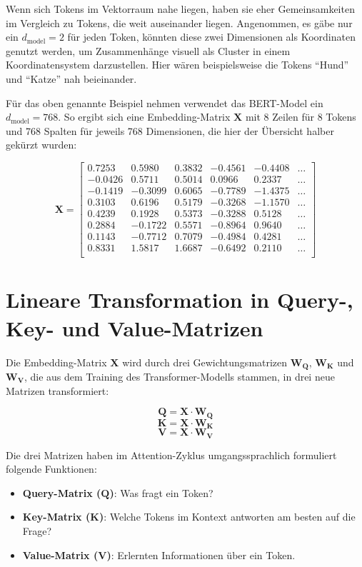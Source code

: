 Wenn sich Tokens im Vektorraum nahe liegen, haben sie eher Gemeinsamkeiten im Vergleich zu Tokens, die weit auseinander liegen.  
Angenommen, es gäbe nur ein \( d_{\text{model}} = 2 \) für jeden Token, könnten diese zwei Dimensionen als Koordinaten genutzt werden, um Zusammenhänge visuell als Cluster in einem Koordinatensystem darzustellen.  
Hier wären beispielsweise die Tokens \enquote{Hund} und \enquote{Katze} nah beieinander.

Für das oben genannte Beispiel nehmen verwendet das BERT-Model ein \( d_{\text{model}} = 768 \).  
So ergibt sich eine Embedding-Matrix $\mathbf{X}$ mit 8 Zeilen für 8 Tokens und 768 Spalten für jeweils 768 Dimensionen, die hier der Übersicht halber gekürzt wurden:

\[
\mathbf{X} =
\begin{bmatrix}
0.7253 & 0.5980 & 0.3832 & -0.4561 & -0.4408 & \dots \\
-0.0426 & 0.5711 & 0.5014 & 0.0966 & 0.2337 & \dots \\
-0.1419 & -0.3099 & 0.6065 & -0.7789 & -1.4375 & \dots \\
0.3103 & 0.6196 & 0.5179 & -0.3268 & -1.1570 & \dots \\
0.4239 & 0.1928 & 0.5373 & -0.3288 & 0.5128 & \dots \\
0.2884 & -0.1722 & 0.5571 & -0.8964 & 0.9640 & \dots \\
0.1143 & -0.7712 & 0.7079 & -0.4984 & 0.4281 & \dots \\
0.8331 & 1.5817 & 1.6687 & -0.6492 & 0.2110 & \dots \\
\end{bmatrix}
\]

\section{Lineare Transformation in Query-, Key- und Value-Matrizen}

Die Embedding-Matrix $\mathbf{X}$ wird durch drei Gewichtungsmatrizen $\mathbf{W_Q}$, $\mathbf{W_K}$ und $\mathbf{W_V}$, die aus dem Training des Transformer-Modells stammen, in drei neue Matrizen transformiert:

\[
\mathbf{Q} = \mathbf{X} \cdot \mathbf{W_Q}
\]
\[
\mathbf{K} = \mathbf{X} \cdot \mathbf{W_K}
\]
\[
\mathbf{V} = \mathbf{X} \cdot \mathbf{W_V}
\]

Die drei Matrizen haben im Attention-Zyklus umgangssprachlich formuliert folgende Funktionen:

\begin{itemize}
    \item \textbf{Query-Matrix (\(\mathbf{Q}\))}: Was fragt ein Token?
    \item \textbf{Key-Matrix (\(\mathbf{K}\))}: Welche Tokens im Kontext antworten am besten auf die Frage?
    \item \textbf{Value-Matrix (\(\mathbf{V}\))}: Erlernten Informationen über ein Token.
\end{itemize}

